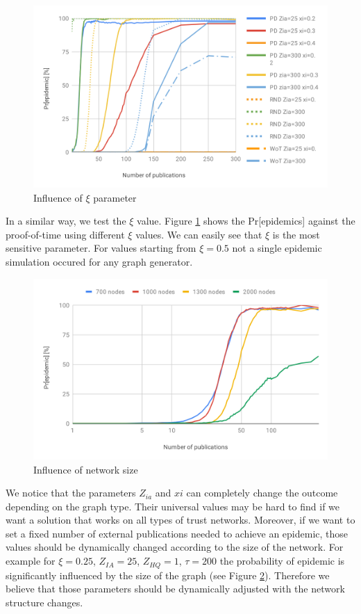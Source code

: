 \begin{figure}[h!]
    \includegraphics[width=\textwidth]{img/influence-of-xi.png}
    \centering
    \caption{Influence of $\xi$ parameter}
    \label{fig:influence-of-xi}
\end{figure} 
In a similar way, we test the $\xi$ value. Figure \ref{fig:influence-of-xi} shows the Pr[epidemics] against the proof-of-time using different $\xi$ values. We can easily see that $\xi$ is the most sensitive parameter. For values starting from $\xi=0.5$ not a single epidemic simulation occured for any graph generator.

\begin{figure}[h!]
    \includegraphics[width=\textwidth]{img/Influence-of-network-size.png}
    \centering
    \caption{Influence of network size}
    \label{fig:influence-network-size}
\end{figure} 
We notice that the parameters $Z_{ia}$ and $xi$ can completely change the outcome depending on the graph type. Their universal values may be hard to find if we want a solution that works on all types of trust networks. Moreover, if we want to set a fixed number of external publications needed to achieve an epidemic, those values should be dynamically changed according to the size of the network.
For example for $\xi=0.25$, $Z_{IA}=25$, $Z_{HQ}=1$, $\tau=200$ the probability of epidemic is significantly influenced by the size of the graph (see Figure \ref{fig:influence-network-size}). Therefore we believe that those parameters should be dynamically adjusted with the network structure changes.

